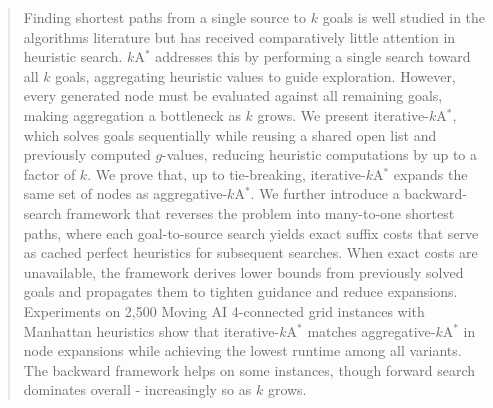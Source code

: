 \begin{abstract}
Finding shortest paths from a single source to $k$ goals is well studied
in the algorithms literature but has received comparatively little attention
in heuristic search. $k$A$^*$ addresses this by performing a single search
toward all $k$ goals, aggregating heuristic values to guide exploration.
However, every generated node must be evaluated against all remaining goals,
making aggregation a bottleneck as $k$ grows. We present
iterative-$k$A$^*$, which solves goals sequentially while reusing a shared
open list and previously computed $g$-values, reducing heuristic computations
by up to a factor of $k$. We prove that, up to tie-breaking,
iterative-$k$A$^*$ expands the same set of nodes as
aggregative-$k$A$^*$. We further introduce a backward-search framework that
reverses the problem into many-to-one shortest paths, where each
goal-to-source search yields exact suffix costs that serve as
cached perfect heuristics for subsequent searches. When exact costs are
unavailable, the framework derives lower bounds from previously solved goals
and propagates them to tighten guidance and reduce expansions.
Experiments on 2,500 Moving AI 4-connected grid instances with Manhattan
heuristics show that iterative-$k$A$^*$ matches aggregative-$k$A$^*$ in
node expansions while achieving the lowest runtime among all variants. The
backward framework helps on some instances, though forward search dominates
overall - increasingly so as $k$ grows.
\end{abstract}
